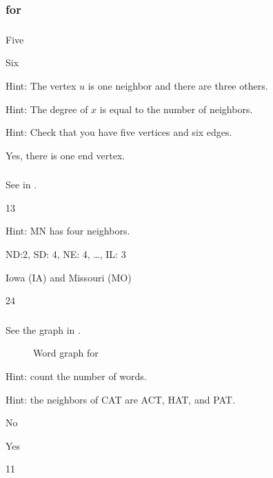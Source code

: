 \subsubsection{\answers for  \subdefngraph}

\subsubsection*{ \answers}
\begin{apart}
    \item Five
    \item Six
    \item Hint: The vertex $u$ is one neighbor and there are three others.
    \item Hint: The degree of $x$ is equal to the number of neighbors.
    \item Hint: Check that you have five vertices and six edges.
    \item Yes, there is one end vertex.
\end{apart}

\subsubsection*{ \answers}
\begin{apart}
    \item See  in .
    \item 13
    \item Hint: MN has four neighbors.
    \item ND:2, SD: 4, NE: 4, \ldots, IL: 3
    \item Iowa (IA) and Missouri (MO)
    \item 24
\end{apart}

\subsubsection*{ \answers}
\begin{apart}
    \item See the graph in .  

    \begin{figure}[hbtp]
        \centering
        
        \caption{Word graph for } 
        \label{fig_word_graph_first}
    \end{figure}

    \item Hint: count the number of words.
    \item Hint: the neighbors of CAT are ACT, HAT, and PAT.
    \item No
    \item Yes
    \item 11
\end{apart}


